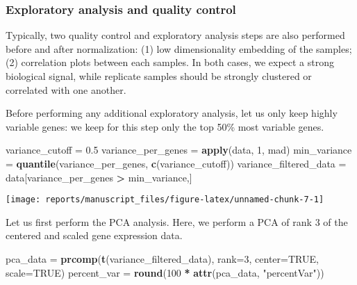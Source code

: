 \documentclass[9pt,a4paper,]{extarticle}
\newenvironment{Shaded}{\begin{snugshade}}{\end{snugshade}}
\newcommand{\CommentTok}[1]{\textcolor[rgb]{0.56,0.35,0.01}{\textit{#1}}}
\newcommand{\DataTypeTok}[1]{\textcolor[rgb]{0.13,0.29,0.53}{#1}}
\newcommand{\DecValTok}[1]{\textcolor[rgb]{0.00,0.00,0.81}{#1}}
\newcommand{\FloatTok}[1]{\textcolor[rgb]{0.00,0.00,0.81}{#1}}
\newcommand{\KeywordTok}[1]{\textcolor[rgb]{0.13,0.29,0.53}{\textbf{#1}}}
\newcommand{\NormalTok}[1]{#1}
\newcommand{\OperatorTok}[1]{\textcolor[rgb]{0.81,0.36,0.00}{\textbf{#1}}}
\newcommand{\OtherTok}[1]{\textcolor[rgb]{0.56,0.35,0.01}{#1}}
\newcommand{\StringTok}[1]{\textcolor[rgb]{0.31,0.60,0.02}{#1}}
\begin{document}
\begin{Shaded}
\end{Shaded}

\hypertarget{exploratory-analysis-and-quality-control}{%
\subsubsection{Exploratory analysis and quality control}\label{exploratory-analysis-and-quality-control}}

Typically, two quality control and exploratory analysis steps are also
performed before and after normalization: (1) low dimensionality embedding of
the samples; (2) correlation plots between each samples. In both cases, we
expect a strong biological signal, while replicate samples should be strongly
clustered or correlated with one another.

Before performing any additional exploratory analysis, let us only keep highly
variable genes: we keep for this step only the top 50\% most variable genes.

\begin{Shaded}
\begin{Highlighting}[]
\NormalTok{variance_cutoff =}\StringTok{ }\FloatTok{0.5}
\NormalTok{variance_per_genes =}\StringTok{ }\KeywordTok{apply}\NormalTok{(data, }\DecValTok{1}\NormalTok{, mad)}
\NormalTok{min_variance =}\StringTok{ }\KeywordTok{quantile}\NormalTok{(variance_per_genes, }\KeywordTok{c}\NormalTok{(variance_cutoff))}
\NormalTok{variance_filtered_data =}\StringTok{ }\NormalTok{data[variance_per_genes }\OperatorTok{>}\StringTok{ }\NormalTok{min_variance,]}
\end{Highlighting}
\end{Shaded}

\begin{center}\texttt{[image: reports/manuscript\_files/figure-latex/unnamed-chunk-7-1]} \end{center}

Let us first perform the PCA analysis. Here, we perform a PCA of rank 3 of the
centered and scaled gene expression data.

\begin{Shaded}
\begin{Highlighting}[]
\NormalTok{pca_data =}\StringTok{ }\KeywordTok{prcomp}\NormalTok{(}\KeywordTok{t}\NormalTok{(variance_filtered_data), }\DataTypeTok{rank=}\DecValTok{3}\NormalTok{, }\DataTypeTok{center=}\OtherTok{TRUE}\NormalTok{, }\DataTypeTok{scale=}\OtherTok{TRUE}\NormalTok{) }
\NormalTok{percent_var =}\StringTok{ }\KeywordTok{round}\NormalTok{(}\DecValTok{100} \OperatorTok{*}\StringTok{ }\KeywordTok{attr}\NormalTok{(pca_data, }\StringTok{"percentVar"}\NormalTok{))}
\end{Highlighting}
\end{Shaded}
\end{document}
